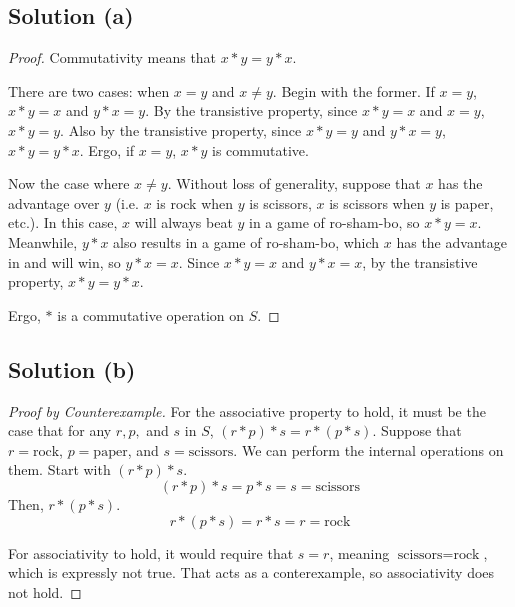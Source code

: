 \documentclass[11pt]{article}
\begin{document}
    \subsection{Solution (a)}
    \begin{proof}
        Commutativity means that $x \ast y = y \ast x$.

        There are two cases: when $x = y$ and $x \neq y$.
        Begin with the former.
        If $x = y$, $x \ast y = x$ and $y \ast x = y$.
        By the transistive property, since $x \ast y = x$ and $x = y$, $x \ast y = y$.
        Also by the transistive property, since $x \ast y = y$ and $y \ast x = y$, $x \ast y = y \ast x$.
        Ergo, if $x = y$, $x \ast y$ is commutative.

        Now the case where $x \neq y$.
        Without loss of generality, suppose that $x$ has the advantage over $y$ (i.e. $x$ is rock when $y$ is scissors, $x$ is scissors when $y$ is paper, etc.).
        In this case, $x$ will always beat $y$ in a game of ro-sham-bo, so $x \ast y = x$.
        Meanwhile, $y \ast x$ also results in a game of ro-sham-bo, which $x$ has the advantage in and will win, so $y \ast x = x$.
        Since $x \ast y = x$ and $y \ast x = x$, by the transistive property, $x \ast y = y \ast x$.

        Ergo, $\ast$ is a commutative operation on $S$.
    \end{proof}

    \subsection{Solution (b)}
    \begin{proof}[Proof by Counterexample]
        For the associative property to hold, it must be the case that for any $r, p,$ and $s$ in $S$, $(r \ast p) \ast s = r \ast (p \ast s)$.
        Suppose that $r = \text{rock}$, $p = \text{paper}$, and $s = \text{scissors}$.
        We can perform the internal operations on them.
        Start with $(r \ast p) \ast s$.
        \begin{equation}
            (r \ast p) \ast s = p \ast s = s = \text{scissors}
        \end{equation}
        Then, $r \ast (p \ast s)$.
        \begin{equation}
            r \ast (p \ast s) = r \ast s = r = \text{rock}
        \end{equation}

        For associativity to hold, it would require that $s = r$, meaning $\text{scissors} = \text{rock}$, which is expressly not true.
        That acts as a conterexample, so associativity does not hold.
    \end{proof}
\pagebreak
\end{document}

